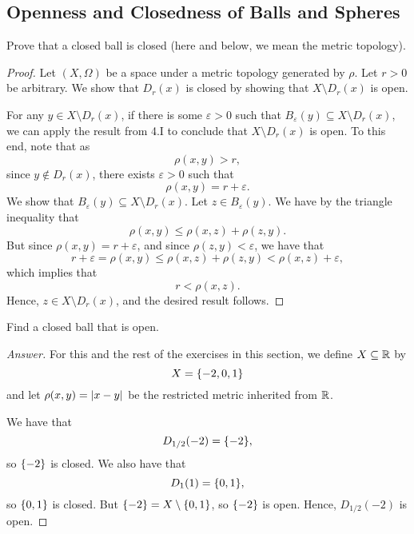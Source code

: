 \subsection{Openness and Closedness of Balls and Spheres}

\begin{minorEx}
    Prove that a closed ball is closed (here and below, we mean the metric
    topology).
\end{minorEx}

\begin{proof}
    Let $(X, \Omega)$ be a space under a metric topology generated by $\rho$.
    Let $r > 0$ be arbitrary.
    We show that $D_{r}(x)$ is closed by showing that $X \setminus D_{r}(x)$ is
    open. 

    For any $y \in X \setminus D_{r}(x)$, if there is some $\varepsilon > 0$
    such that $B_{\varepsilon}(y) \subseteq X \setminus D_{r}(x)$, we can apply
    the result from 4.I to conclude that $X \setminus D_{r}(x)$ is open. To this
    end, note that as
    \[
        \rho(x, y) > r,
    \]
    since $y \notin D_{r}(x)$, there exists $\varepsilon > 0$ such that
    \[
        \rho(x, y) = r + \varepsilon.
    \]
    We show that $B_{\varepsilon}(y) \subseteq X \setminus D_{r}(x)$. Let $z \in
    B_{\varepsilon}(y)$. We have by the triangle inequality that
    \[
        \rho(x, y) \leq \rho(x, z) + \rho(z, y).
    \]
    But since $\rho(x, y) = r + \varepsilon$, and since $\rho(z, y) <
    \varepsilon$, we have that
    \[
        r + \varepsilon = \rho(x, y) \leq \rho(x, z) + \rho(z, y) < \rho(x, z) +
        \varepsilon,
    \]
    which implies that 
    \[
        r < \rho(x, z).
    \]
    Hence, $z \in X \setminus D_{r}(x)$, and the desired result follows.
\end{proof}

\begin{minorEx}
    Find a closed ball that is open.
\end{minorEx}

\begin{proof}[Answer]
    For this and the rest of the exercises in this section, we define $X
    \subseteq \mathbb{R}$ by
    \[
        X = \{-2, 0, 1\}
    \]
    and let $\rho(x, y) = |x - y|$ be the restricted metric inherited from
    $\mathbb{R}$. 

    We have that
    \[
        D_{1/2}(-2) = \{-2\},
    \]
    so $\{-2\}$ is closed. We also have that
    \[
        D_{1}(1) = \{0, 1\},
    \]
    so $\{0, 1\}$ is closed. But $\{-2\} = X \setminus \{0, 1\}$, so
    $\{-2\}$ is open. Hence, $D_{1/2}(-2)$ is open.
\end{proof}

